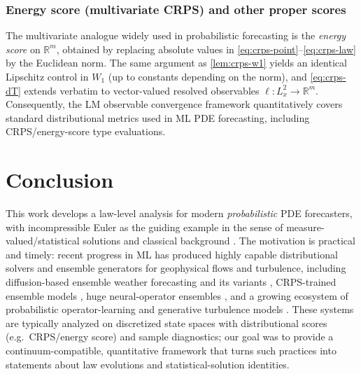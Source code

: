 \documentclass{article}
\numberwithin{equation}{section}
\theoremstyle{plain}
\theoremstyle{definition}
\theoremstyle{remark}
\newcommand{\R}{\mathbb{R}}
\begin{document}
\subsubsection{Energy score (multivariate CRPS) and other proper scores}

The multivariate analogue widely used in probabilistic forecasting is the \emph{energy score} on $\R^m$,
obtained by replacing absolute values in \eqref{eq:crps-point}--\eqref{eq:crps-law} by the Euclidean norm.
The same argument as \cref{lem:crps-w1} yields an identical Lipschitz control in $W_1$ (up to constants depending on the norm),
and \eqref{eq:crps-dT} extends verbatim to vector-valued resolved observables $\ell:L^2_x\to\R^m$.
Consequently, the LM observable convergence framework quantitatively covers standard distributional metrics used in ML PDE
forecasting, including CRPS/energy-score type evaluations.

\section{Conclusion}

This work develops a law-level analysis for modern \emph{probabilistic} PDE forecasters, with incompressible Euler as the
guiding example in the sense of measure-valued/statistical solutions \cite{LMP2021} and classical background
\cite{majda2002vorticity}. The motivation is practical and timely: recent progress in ML has produced highly capable
distributional solvers and ensemble generators for geophysical flows and turbulence, including diffusion-based ensemble
weather forecasting and its variants \cite{price2023gencast,price2025probabilistic,larsson2025diffusion,andrae2024continuous},
CRPS-trained ensemble models \cite{lang2026aifs}, huge neural-operator ensembles \cite{mahesh2024huge,mahesh2024huge2}, and a
growing ecosystem of probabilistic operator-learning and generative turbulence models
\cite{bulte2025probabilistic,kohl2023benchmarking,du2024conditional,gao2024bayesian,lienen2023zero,oommen2024integrating,boxho2025turbulent}.
These systems are typically analyzed on discretized state spaces with distributional scores (e.g.\ CRPS/energy score) and
sample diagnostics; our goal was to provide a continuum-compatible, quantitative framework that turns such practices into
statements about law evolutions and statistical-solution identities.
\end{document}
